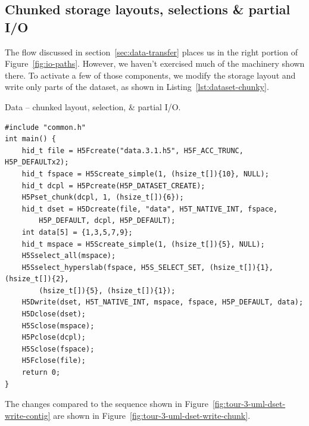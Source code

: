 \subsection{Chunked storage layouts, selections \& partial I/O}\label{sec:layouts-selections}

The flow discussed in section~\ref{sec:data-transfer} places us in the right portion of Figure~\ref{fig:io-paths}. However, we haven't exercised much of the machinery shown there. To activate a few of those components, we modify the storage layout and write only parts of the dataset, as shown in Listing~\ref{lst:dataset-chunky}.

\begin{listing}
\centering
\caption{Data -- chunked layout, selection, \& partial I/O.}
\label{lst:dataset-chunky}
\begin{verbatim}
#include "common.h"
int main() {
    hid_t file = H5Fcreate("data.3.1.h5", H5F_ACC_TRUNC, H5P_DEFAULTx2);
    hid_t fspace = H5Screate_simple(1, (hsize_t[]){10}, NULL);
    hid_t dcpl = H5Pcreate(H5P_DATASET_CREATE);
    H5Pset_chunk(dcpl, 1, (hsize_t[]){6});
    hid_t dset = H5Dcreate(file, "data", H5T_NATIVE_INT, fspace,
        H5P_DEFAULT, dcpl, H5P_DEFAULT);
    int data[5] = {1,3,5,7,9};
    hid_t mspace = H5Screate_simple(1, (hsize_t[]){5}, NULL);
    H5Sselect_all(mspace);
    H5Sselect_hyperslab(fspace, H5S_SELECT_SET, (hsize_t[]){1}, (hsize_t[]){2},
        (hsize_t[]){5}, (hsize_t[]){1});
    H5Dwrite(dset, H5T_NATIVE_INT, mspace, fspace, H5P_DEFAULT, data);
    H5Dclose(dset);
    H5Sclose(mspace);
    H5Pclose(dcpl);
    H5Sclose(fspace);
    H5Fclose(file);
    return 0;
}
\end{verbatim}
\end{listing}

The changes compared to the sequence shown in Figure~\ref{fig:tour-3-uml-dset-write-contig} are shown in Figure~\ref{fig:tour-3-uml-dset-write-chunk}.


